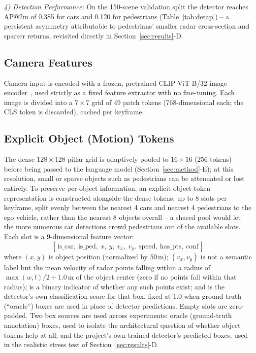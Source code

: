 \documentclass[conference]{IEEEtran}
\begin{document}
\emph{4) Detection Performance:} On the 150-scene validation split the detector reaches AP@2m of 0.385 for cars
and 0.120 for pedestrians (Table~\ref{tab:detap}) -- a persistent asymmetry attributable to pedestrians' smaller
radar cross-section and sparser returns, revisited directly in Section~\ref{sec:results}-D.

\subsection{Camera Features}
Camera input is encoded with a frozen, pretrained CLIP ViT-B/32 image encoder~\cite{radford2021clip}, used
strictly as a fixed feature extractor with no fine-tuning. Each image is divided into a $7\times7$ grid of 49
patch tokens (768-dimensional each; the CLS token is discarded), cached per keyframe.

\subsection{Explicit Object (Motion) Tokens}
The dense $128\times128$ pillar grid is adaptively pooled to $16\times16$ (256 tokens) before being passed to the
language model (Section~\ref{sec:method}-E); at this resolution, small or sparse objects such as pedestrians can
be attenuated or lost entirely. To preserve per-object information, an explicit object-token representation is
constructed alongside the dense tokens: up to 8 slots per keyframe, split evenly between the nearest 4 cars and
nearest 4 pedestrians to the ego vehicle, rather than the nearest 8 objects overall -- a shared pool would let the
more numerous car detections crowd pedestrians out of the available slots. Each slot is a 9-dimensional feature
vector:
\[
[\,\text{is\_car},\ \text{is\_ped},\ x,\ y,\ v_x,\ v_y,\ \text{speed},\ \text{has\_pts},\ \text{conf}\,]
\]
where $(x,y)$ is object position (normalized by 50\,m); $(v_x,v_y)$ is not a semantic label but the mean velocity
of radar points falling within a radius of $\max(w,l)/2 + 1.0$\,m of the object center (zero if no points fall
within that radius);  is a binary indicator of whether any such points exist; and  is
the detector's own classification score for that box, fixed at 1.0 when ground-truth (``oracle'') boxes are used
in place of detector predictions. Empty slots are zero-padded. Two box sources are used across experiments: oracle
(ground-truth annotation) boxes, used to isolate the architectural question of whether object tokens help at all;
and the project's own trained detector's predicted boxes, used in the realistic stress test of
Section~\ref{sec:results}-D.
\end{document}
